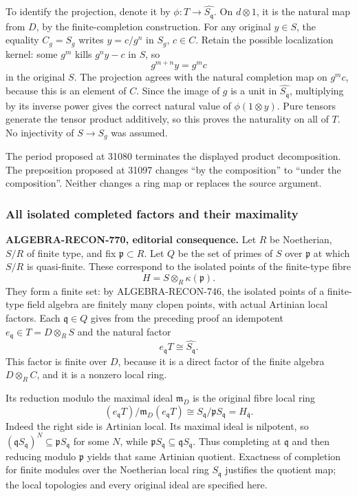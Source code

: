 To identify the projection, denote it by \(\phi:T\to\widehat{S_{\mathfrak q}}\). On \(d\otimes1\), it is the natural map from \(D\), by the finite-completion construction. For any original \(y\in S\), the equality \(C_g=S_g\) writes \(y=c/g^n\) in \(S_g\), \(c\in C\). Retain the possible localization kernel: some \(g^m\) kills \(g^ny-c\) in \(S\), so \[
 g^{m+n}y=g^m c
\] in the original \(S\). The projection agrees with the natural completion map on \(g^mc\), because this is an element of \(C\). Since the image of \(g\) is a unit in \(\widehat{S_{\mathfrak q}}\), multiplying by its inverse power gives the correct natural value of \(\phi(1\otimes y)\). Pure tensors generate the tensor product additively, so this proves the naturality on all of \(T\). No injectivity of \(S\to S_g\) was assumed.

The period proposed at 31080 terminates the displayed product decomposition. The preposition proposed at 31097 changes ``by the composition'' to ``under the composition''. Neither changes a ring map or replaces the source argument.

\subsubsection{All isolated completed factors and their maximality}\label{algebra-proof-033-all-isolated-completed-factors-and-their-maximality}

\textbf{ALGEBRA-RECON-770, editorial consequence.} Let \(R\) be Noetherian, \(S/R\) of finite type, and fix \(\mathfrak p\subset R\). Let \(Q\) be the set of primes of \(S\) over \(\mathfrak p\) at which \(S/R\) is quasi-finite. These correspond to the isolated points of the finite-type fibre \[
 H=S\otimes_R\kappa(\mathfrak p).
\] They form a finite set: by ALGEBRA-RECON-746, the isolated points of a finite-type field algebra are finitely many clopen points, with actual Artinian local factors. Each \(\mathfrak q\in Q\) gives from the preceding proof an idempotent \(e_{\mathfrak q}\in T=D\otimes_R S\) and the natural factor \[
 e_{\mathfrak q}T\cong\widehat{S_{\mathfrak q}}.
\] This factor is finite over \(D\), because it is a direct factor of the finite algebra \(D\otimes_R C\), and it is a nonzero local ring.

Its reduction modulo the maximal ideal \(\mathfrak m_D\) is the original fibre local ring \[
 (e_{\mathfrak q}T)/\mathfrak m_D(e_{\mathfrak q}T)
 \cong S_{\mathfrak q}/\mathfrak pS_{\mathfrak q}
 =H_{\bar{\mathfrak q}}.
 \tag{4}
\] Indeed the right side is Artinian local. Its maximal ideal is nilpotent, so \((\mathfrak qS_{\mathfrak q})^N\subseteq\mathfrak pS_{\mathfrak q}\) for some \(N\), while \(\mathfrak pS_{\mathfrak q}\subseteq\mathfrak qS_{\mathfrak q}\). Thus completing at \(\mathfrak q\) and then reducing modulo \(\mathfrak p\) yields that same Artinian quotient. Exactness of completion for finite modules over the Noetherian local ring \(S_{\mathfrak q}\) justifies the quotient map; the local topologies and every original ideal are specified here.

